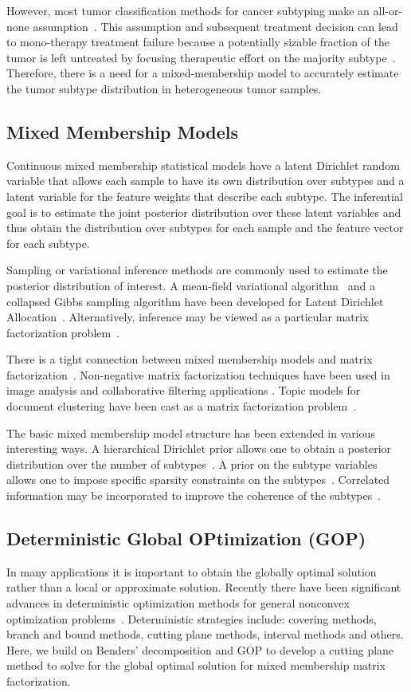 \documentclass[11pt]{article}
\begin{document}
However, most tumor classification methods for cancer subtyping make an all-or-none assumption~\cite{}. 
This assumption and subsequent treatment decision can lead to mono-therapy treatment failure because a potentially sizable fraction of the tumor is left untreated by focusing therapeutic effort on the majority subtype~\cite{}. 
Therefore, there is a need for a mixed-membership model to accurately estimate the tumor subtype distribution in heterogeneous tumor samples.

\subsection{Mixed Membership Models}
Continuous mixed membership statistical models have a latent Dirichlet random variable that allows each sample to have its own distribution over subtypes and a latent variable for the feature weights that describe each subtype. 
The inferential goal is to estimate the joint posterior distribution over these latent variables and thus obtain the distribution over subtypes for each sample and the feature vector for each subtype.

Sampling or variational inference methods are commonly used to estimate the posterior distribution of interest. 
A mean-field variational algorithm~\cite{Blei2003a} and a collapsed Gibbs sampling algorithm have been developed for Latent Dirichlet Allocation~\cite{Xiao2010}. 
Alternatively, inference may be viewed as a particular matrix factorization problem~\cite{Mackey2010}.


There is a tight connection between mixed membership models
and matrix factorization~\cite{Singh2008}. Non-negative
matrix factorization techniques have been used in image
analysis and collaborative filtering applications
\cite{Lee1999,Mackey2010}. Topic models for document clustering have been cast as a matrix factorization problem~\cite{Xu2003}.

The basic mixed membership model structure has been extended
in various interesting ways. A hierarchical Dirichlet prior
allows one to obtain a posterior distribution over the number
of subtypes~\cite{Teh2005}. A prior on the subtype variables
allows one to impose specific sparsity constraints on the
subtypes~\cite{Kaban:2007gz,MacKay:1992ul,Taddy:2012dd}.
Correlated information may be incorporated to improve the
coherence of the subtypes~\cite{Blei2006}.

\subsection{Deterministic Global OPtimization (GOP)}
In many applications it is important to obtain the globally optimal solution rather than a local or approximate solution. 
Recently there have been significant advances in deterministic optimization methods for general nonconvex optimization problems~\cite{Floudas2008, Horst2002}. 
Deterministic strategies include: covering methods, branch and bound methods, cutting plane methods, interval methods and others. 
Here, we build on Benders' decomposition and GOP to develop a cutting plane method to solve for the global optimal solution for mixed membership matrix factorization.
\end{document}
